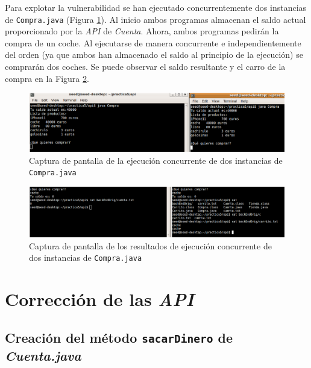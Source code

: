 \documentclass{article}
\begin{document}
Para explotar la vulnerabilidad se han ejecutado concurrentemente dos instancias de \texttt{Compra.java} (Figura \ref{fig:p1_1}). Al inicio ambos programas almacenan el saldo actual proporcionado por la \textit{API} de \textit{Cuenta}. Ahora, ambos programas pedirán la compra de un coche. Al ejecutarse de manera concurrente e independientemente del orden (ya que ambos han almacenado el saldo al principio de la ejecución) se comprarán dos coches. Se puede observar el saldo resultante y el carro de la compra en la Figura \ref{fig:p1_2}.

\begin{figure}[h!]
    \centering
    \includegraphics[scale=0.65]{images/p1_1.png}
    \caption{Captura de pantalla de la ejecución concurrente de dos instancias de \texttt{Compra.java}}
    \label{fig:p1_1}
\end{figure}

\begin{figure}[h!]
    \centering
    \includegraphics[scale=0.58]{images/p1_2.png}
    \caption{Captura de pantalla de los resultados de ejecución concurrente de dos instancias de \texttt{Compra.java}}
    \label{fig:p1_2}
\end{figure}

\section{Corrección de las \textit{API}}

\subsection{Creación del método \texttt{sacarDinero} de \textit{Cuenta.java}}
\end{document}
